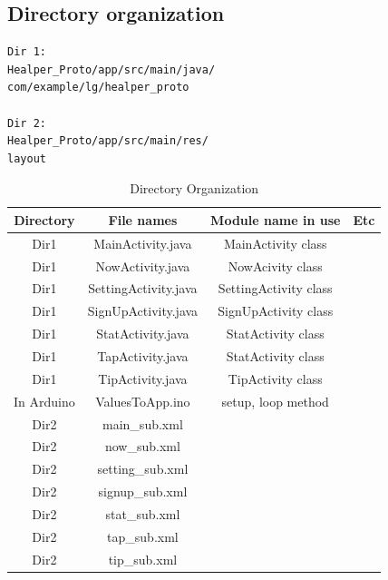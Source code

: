 \documentclass[conference]{IEEEtran}
\begin{document}
\subsection{Directory organization}

\begin{verbatim}
Dir 1: 
Healper_Proto/app/src/main/java/
com/example/lg/healper_proto

Dir 2:
Healper_Proto/app/src/main/res/
layout
\end{verbatim}

\begin{table}[H]
\caption{Directory Organization}
\begin{tabular}{|c|c|c|c|}\hline

Directory & File names & Module name in use & Etc \\ \hline \hline

Dir1 & MainActivity.java & MainActivity class & \\ \hline 

Dir1& NowActivity.java & NowAcivity class & \\ \hline 

Dir1 & SettingActivity.java & SettingActivity class & \\ \hline 

Dir1 & SignUpActivity.java & SignUpActivity class & \\  \hline 

Dir1 & StatActivity.java & StatActivity class & \\ \hline 

Dir1& TapActivity.java & StatActivity class & \\ \hline 

Dir1 & TipActivity.java & TipActivity class & \\ \hline 

In Arduino & ValuesToApp.ino & setup, loop method & \\ \hline  

Dir2& main\_{}sub.xml & & \\ \hline 

Dir2& now\_{}sub.xml & &  \\ \hline

Dir2& setting\_{}sub.xml & & \\ \hline 

Dir2 & signup\_{}sub.xml & & \\ \hline 

Dir2 & stat\_{}sub.xml & & \\ \hline 

Dir2 & tap\_{}sub.xml & & \\ \hline

Dir2 & tip\_{}sub.xml & & \\ \hline
\end{tabular}\\\\\\\\

\end{table}
\end{document}
